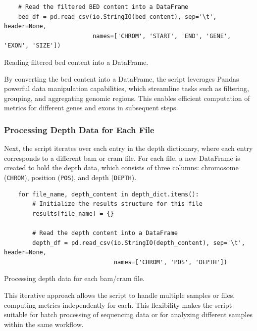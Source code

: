 \begin{longlisting}
\begin{verbatim}
    # Read the filtered BED content into a DataFrame
    bed_df = pd.read_csv(io.StringIO(bed_content), sep='\t', header=None,
                         names=['CHROM', 'START', 'END', 'GENE', 'EXON', 'SIZE'])
\end{verbatim}
\caption{Reading filtered \ac{bed} content into a DataFrame.}
\label{lbl:metrics_bed_df}
\end{longlisting}

By converting the \ac{bed} content into a DataFrame, the script leverages Pandas powerful data manipulation capabilities, which streamline tasks such as filtering, grouping, and aggregating genomic regions. This enables efficient computation of metrics for different genes and exons in subsequent steps.

\subsubsection{\textbf{Processing Depth Data for Each File}}

Next, the script iterates over each entry in the depth dictionary, where each entry corresponds to a different \ac{bam} or \ac{cram} file. For each file, a new DataFrame is created to hold the depth data, which consists of three columns: chromosome (\texttt{CHROM}), position (\texttt{POS}), and depth (\texttt{DEPTH}).

\begin{longlisting}
\begin{verbatim}
    for file_name, depth_content in depth_dict.items():
        # Initialize the results structure for this file
        results[file_name] = {}
        
        # Read the depth content into a DataFrame
        depth_df = pd.read_csv(io.StringIO(depth_content), sep='\t', header=None,
                               names=['CHROM', 'POS', 'DEPTH'])
\end{verbatim}
\caption{Processing depth data for each \ac{bam}/\ac{cram} file.}
\label{lbl:metrics_depth_df}
\end{longlisting}

This iterative approach allows the script to handle multiple samples or files, computing metrics independently for each. This flexibility makes the script suitable for batch processing of sequencing data or for analyzing different samples within the same workflow.

